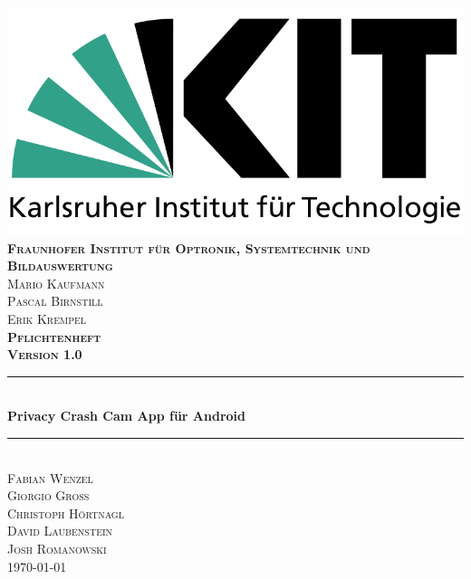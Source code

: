 \begin{titlepage}

\begin{center}

\includegraphics[width=0.5\linewidth]{subtopicsFuncspec/Res/KITLogo.png}\\[0.5cm]
  

\textsc{\bfseries Fraunhofer Institut für Optronik, Systemtechnik und Bildauswertung}\\[0.5cm]
\textsc{Mario Kaufmann\\Pascal Birnstill\\Erik Krempel}\\[2cm]

\textsc{\LARGE \bfseries Pflichtenheft}\\[0.5cm]
\textsc{\bfseries Version 1.0}\\[0.2cm]


\newcommand{\HRule}{\rule{\linewidth}{0.5mm}} 
{\color{mintgreen}\HRule} \\[0.4cm]
{\huge \bfseries Privacy Crash Cam App für Android}\\[0.4cm]
{\color{mintgreen}\HRule} \\[1cm]

\textsc{\Large Fabian Wenzel\\ Giorgio Groß\\ Christoph Hörtnagl\\ David Laubenstein\\[0.15cm]Josh Romanowski} \\[2cm]

{\large \today}

\end{center}

\end{titlepage}